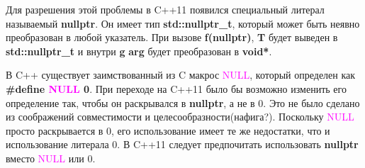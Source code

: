 Для разрешения этой проблемы в C++11 появился специальный литерал называемый {\bf nullptr}. Он имеет тип {\bf std::nullptr\_t}, который может быть неявно преобразован в любой указатель. При вызове {\bf f(nullptr)}, {\bf T} будет выведен в {\bf std::nullptr\_t} и внутри {\bf g} {\bf arg} будет преобразован в {\bf void*}.

В C++ существует заимствованный из C макрос \textcolor{magenta}{NULL}, который определен как {\bf \#define \textcolor{magenta}{NULL} 0}. При переходе на C++11 было бы возможно изменить его определение так, чтобы он раскрывался в {\bf nullptr}, а не в 0. Это не было сделано из соображений совместимости и целесообразности(нафига?).
Поскольку \textcolor{magenta}{NULL} просто раскрывается в 0, его использование имеет те же недостатки, что и использование литерала 0. В C++11 следует предпочитать использовать {\bf nullptr} вместо \textcolor{magenta}{NULL} или 0.
